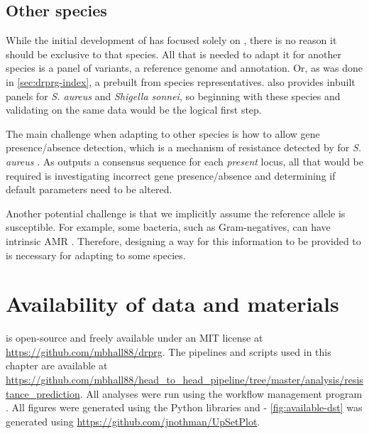 \subsection{Other species}

While the initial development of \drprg{} has focused solely on \mtb{}, there is no reason it should be exclusive to that species. All that is needed to adapt it for another species is a panel of variants, a reference genome and annotation. Or, as was done in \autoref{sec:drprg-index}, a prebuilt \panrg{} from species representatives. \mykrobe{} also provides inbuilt panels for \textit{S. aureus} and \textit{Shigella sonnei}, so beginning with these species and validating on the same data would be the logical first step. 

The main challenge when adapting to other species is how to allow gene presence/absence detection, which is a mechanism of resistance detected by \mykrobe{} for \textit{S. aureus} \cite{bradley2015}. As \pandora{} outputs a consensus sequence for each \emph{present} locus, all that would be required is investigating incorrect gene presence/absence and determining if default parameters need to be altered.

Another potential challenge is that we implicitly assume the reference allele is susceptible. For example, some bacteria, such as Gram-negatives, can have intrinsic AMR \cite{Venter2017}. Therefore, designing a way for this information to be provided to \drprg{} is necessary for adapting \drprg{} to some species.

\section{Availability of data and materials}

\drprg{} is open-source and freely available under an MIT license at \url{https://github.com/mbhall88/drprg}. The pipelines and scripts used in this chapter are available at \url{https://github.com/mbhall88/head_to_head_pipeline/tree/master/analysis/resistance_prediction}. All analyses were run using the workflow management program  \cite{snakemake2021}. All figures were generated using the Python libraries  \cite{matplotlib} and  \cite{seaborn} - \autoref{fig:available-dst} was generated using \url{https://github.com/jnothman/UpSetPlot}.

